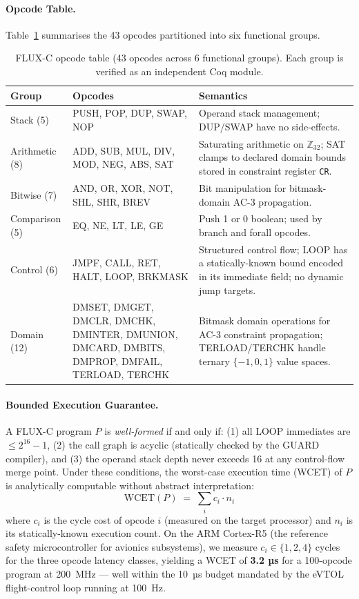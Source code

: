 \documentclass[conference]{IEEEtran}
\begin{document}
\paragraph{Opcode Table.}
Table~\ref{tab:opcodes} summarises the 43 opcodes partitioned into six
functional groups.

\begin{table}[t]
\centering
\caption{FLUX-C opcode table (43 opcodes across 6 functional groups).
Each group is verified as an independent Coq module.}
\label{tab:opcodes}
\renewcommand{\arraystretch}{1.15}
\begin{tabular}{llp{5.5cm}}
\toprule
\textbf{Group} & \textbf{Opcodes} & \textbf{Semantics} \\
\midrule
Stack (5)     & PUSH, POP, DUP, SWAP, NOP
              & Operand stack management; DUP/SWAP have no side-effects. \\
Arithmetic (8) & ADD, SUB, MUL, DIV, MOD, NEG, ABS, SAT
              & Saturating arithmetic on $\mathbb{Z}_{32}$; SAT clamps to
                declared domain bounds stored in constraint register \texttt{CR}. \\
Bitwise (7)   & AND, OR, XOR, NOT, SHL, SHR, BREV
              & Bit manipulation for bitmask-domain AC-3 propagation. \\
Comparison (5) & EQ, NE, LT, LE, GE
              & Push 1 or 0 boolean; used by branch and forall opcodes. \\
Control (6)   & JMPF, CALL, RET, HALT, LOOP, BRKMASK
              & Structured control flow; LOOP has a statically-known bound
                encoded in its immediate field; no dynamic jump targets. \\
Domain (12)   & DMSET, DMGET, DMCLR, DMCHK, DMINTER, DMUNION,
                DMCARD, DMBITS, DMPROP, DMFAIL, TERLOAD, TERCHK
              & Bitmask domain operations for AC-3 constraint propagation;
                TERLOAD/TERCHK handle ternary $\{-1,0,1\}$ value spaces. \\
\bottomrule
\end{tabular}
\end{table}

\paragraph{Bounded Execution Guarantee.}
A FLUX-C program $P$ is \emph{well-formed} if and only if:
(1) all LOOP immediates are $\le 2^{16}-1$,
(2) the call graph is acyclic (statically checked by the GUARD compiler),
and (3) the operand stack depth never exceeds 16 at any control-flow merge
point.
Under these conditions, the worst-case execution time (WCET) of $P$ is
analytically computable without abstract interpretation:
\[
  \mathrm{WCET}(P) \;=\; \sum_{i} c_i \cdot n_i
\]
where $c_i$ is the cycle cost of opcode $i$ (measured on the target
processor) and $n_i$ is its statically-known execution count.
On the ARM Cortex-R5 (the reference safety microcontroller for avionics
subsystems), we measure $c_i \in \{1, 2, 4\}$ cycles for the three
opcode latency classes, yielding a WCET of \textbf{3.2 µs} for a
100-opcode program at 200~MHz — well within the 10~µs budget mandated
by the eVTOL flight-control loop running at 100~Hz.
\end{document}
